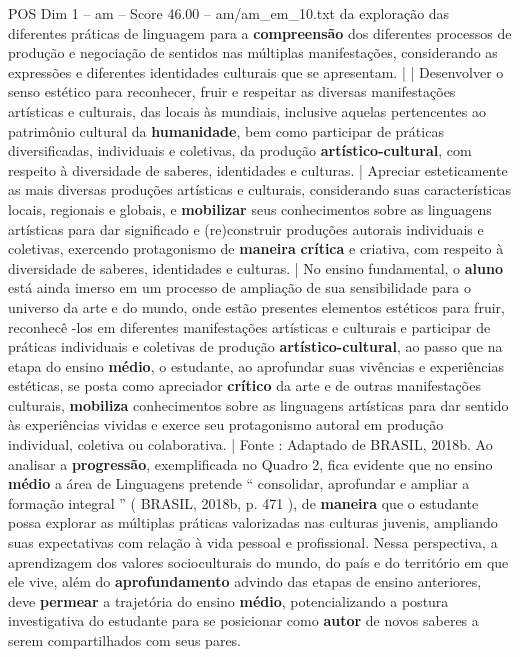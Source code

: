 \begin{textsample}{POS Dim 1 – am – Score 46.00 – am/am\_em\_10.txt}
da exploração das diferentes práticas de linguagem para a \textbf{compreensão} dos diferentes processos de produção e negociação de sentidos nas múltiplas manifestações, considerando as expressões e diferentes identidades culturais que se apresentam. | | Desenvolver o senso estético para reconhecer, fruir e respeitar as diversas manifestações artísticas e culturais, das locais às mundiais, inclusive aquelas pertencentes ao patrimônio cultural da \textbf{humanidade}, bem como participar de práticas diversificadas, individuais e coletivas, da produção \textbf{artístico-cultural}, com respeito à diversidade de saberes, identidades e culturas. | Apreciar esteticamente as mais diversas produções artísticas e culturais, considerando suas características locais, regionais e globais, e \textbf{mobilizar} seus conhecimentos sobre as linguagens artísticas para dar significado e (re)construir produções autorais individuais e coletivas, exercendo protagonismo de \textbf{maneira} \textbf{crítica} e criativa, com respeito à diversidade de saberes, identidades e culturas. | No ensino fundamental, o \textbf{aluno} está ainda imerso em um processo de ampliação de sua sensibilidade para o universo da arte e do mundo, onde estão presentes elementos estéticos para fruir, reconhecê -los em diferentes manifestações artísticas e culturais e participar de práticas individuais e coletivas de produção \textbf{artístico-cultural}, ao passo que na etapa do ensino \textbf{médio}, o estudante, ao aprofundar suas vivências e experiências estéticas, se posta como apreciador \textbf{crítico} da arte e de outras manifestações culturais, \textbf{mobiliza} conhecimentos sobre as linguagens artísticas para dar sentido às experiências vividas e exerce seu protagonismo autoral em produção individual, coletiva ou colaborativa. | Fonte : Adaptado de BRASIL, 2018b.
Ao analisar a \textbf{progressão}, exemplificada no Quadro 2, fica evidente que no ensino \textbf{médio} a área de Linguagens pretende “ consolidar, aprofundar e ampliar a formação integral ” ( BRASIL, 2018b, p. 471 ), de \textbf{maneira} que o estudante possa explorar as múltiplas práticas valorizadas nas culturas juvenis, ampliando suas expectativas com relação à vida pessoal e profissional.
Nessa perspectiva, a aprendizagem dos valores socioculturais do mundo, do país e do território em que ele vive, além do \textbf{aprofundamento} advindo das etapas de ensino anteriores, deve \textbf{permear} a trajetória do ensino \textbf{médio}, potencializando a postura investigativa do estudante para se posicionar como \textbf{autor} de novos saberes a serem compartilhados com seus pares.

\end{textsample}
